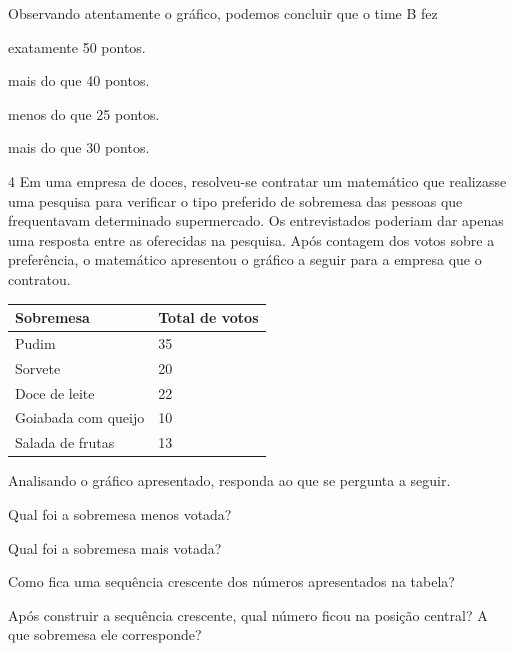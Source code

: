 Observando atentamente o gráfico, podemos concluir que o time B fez

\begin{escolha}
\item
  exatamente 50 pontos.
\item
  mais do que 40 pontos.
\item
  menos do que 25 pontos.
\item
  mais do que 30 pontos.
\end{escolha}


\num{4} Em uma empresa de doces, resolveu-se contratar um matemático que realizasse uma
pesquisa para verificar o tipo preferido de sobremesa das pessoas que
frequentavam determinado supermercado. Os entrevistados poderiam dar
apenas uma resposta entre as oferecidas na pesquisa. Após contagem dos
votos sobre a preferência, o matemático apresentou o gráfico a seguir
para a empresa que o contratou.

\begin{longtable}[]{@{}ll@{}}
\toprule
Sobremesa & Total de votos\tabularnewline
\midrule
\endhead
Pudim & 35\tabularnewline
Sorvete & 20\tabularnewline
Doce de leite & 22\tabularnewline
Goiabada com queijo & 10\tabularnewline
Salada de frutas & 13\tabularnewline
\bottomrule
\end{longtable}

Analisando o gráfico apresentado, responda ao que se pergunta a seguir.

\begin{escolha}
\item
  Qual foi a sobremesa menos votada?


\item
  Qual foi a sobremesa mais votada?


\item
  Como fica uma sequência crescente dos números apresentados na tabela?


\item
  Após construir a sequência crescente, qual número ficou na posição
  central? A que sobremesa ele corresponde?

\end{escolha}

